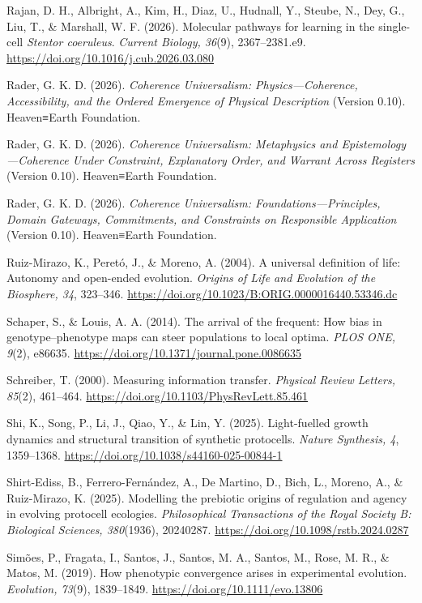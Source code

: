\documentclass[
  11pt,
]{article}
\begin{document}
Rajan, D. H., Albright, A., Kim, H., Diaz, U., Hudnall, Y., Steube, N.,
Dey, G., Liu, T., \& Marshall, W. F. (2026). Molecular pathways for
learning in the single-cell \emph{Stentor coeruleus}. \emph{Current
Biology, 36}(9), 2367--2381.e9.
\url{https://doi.org/10.1016/j.cub.2026.03.080}

Rader, G. K. D. (2026). \emph{Coherence Universalism:
Physics---Coherence, Accessibility, and the Ordered Emergence of
Physical Description} (Version 0.10). Heaven≡Earth Foundation.

Rader, G. K. D. (2026). \emph{Coherence Universalism: Metaphysics and
Epistemology---Coherence Under Constraint, Explanatory Order, and
Warrant Across Registers} (Version 0.10). Heaven≡Earth Foundation.

Rader, G. K. D. (2026). \emph{Coherence Universalism:
Foundations---Principles, Domain Gateways, Commitments, and Constraints
on Responsible Application} (Version 0.10). Heaven≡Earth Foundation.

Ruiz-Mirazo, K., Peretó, J., \& Moreno, A. (2004). A universal
definition of life: Autonomy and open-ended evolution. \emph{Origins of
Life and Evolution of the Biosphere, 34}, 323--346.
\url{https://doi.org/10.1023/B:ORIG.0000016440.53346.dc}

Schaper, S., \& Louis, A. A. (2014). The arrival of the frequent: How
bias in genotype--phenotype maps can steer populations to local optima.
\emph{PLOS ONE, 9}(2), e86635.
\url{https://doi.org/10.1371/journal.pone.0086635}

Schreiber, T. (2000). Measuring information transfer. \emph{Physical
Review Letters, 85}(2), 461--464.
\url{https://doi.org/10.1103/PhysRevLett.85.461}

Shi, K., Song, P., Li, J., Qiao, Y., \& Lin, Y. (2025). Light-fuelled
growth dynamics and structural transition of synthetic protocells.
\emph{Nature Synthesis, 4}, 1359--1368.
\url{https://doi.org/10.1038/s44160-025-00844-1}

Shirt-Ediss, B., Ferrero-Fernández, A., De Martino, D., Bich, L.,
Moreno, A., \& Ruiz-Mirazo, K. (2025). Modelling the prebiotic origins
of regulation and agency in evolving protocell ecologies.
\emph{Philosophical Transactions of the Royal Society B: Biological
Sciences, 380}(1936), 20240287.
\url{https://doi.org/10.1098/rstb.2024.0287}

Simões, P., Fragata, I., Santos, J., Santos, M. A., Santos, M., Rose, M.
R., \& Matos, M. (2019). How phenotypic convergence arises in
experimental evolution. \emph{Evolution, 73}(9), 1839--1849.
\url{https://doi.org/10.1111/evo.13806}
\end{document}
